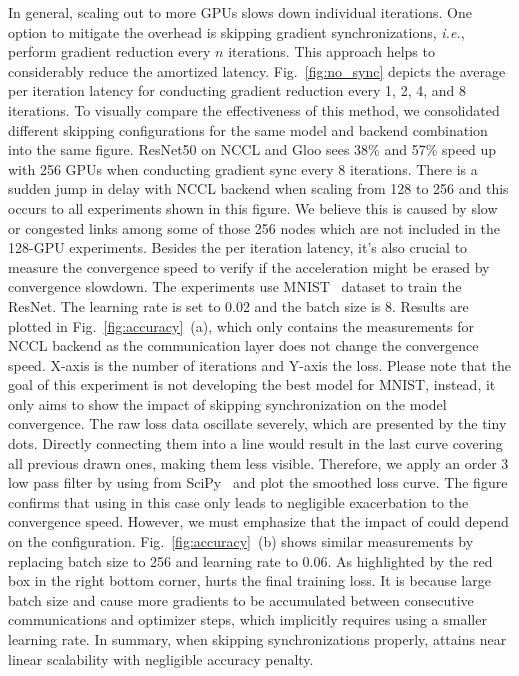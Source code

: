 In general, scaling out to more GPUs slows down individual iterations. One option to mitigate the overhead is skipping gradient synchronizations, \emph{i.e.}, perform gradient reduction every $n$ iterations. This approach helps to considerably reduce the amortized latency. Fig.~\ref{fig:no_sync} depicts the average per iteration latency for conducting gradient reduction every 1, 2, 4, and 8 iterations. To visually compare the effectiveness of this method, we consolidated different skipping configurations for the same model and backend combination into the same figure. 
ResNet50 on NCCL and Gloo sees 38\% and 57\% speed up with 256 GPUs when conducting gradient sync every 8 iterations. There is a sudden jump in delay with NCCL backend when scaling from 128 to 256 and this occurs to all experiments shown in this figure. We believe this is caused by slow or congested links among some of those 256 nodes which are not included in the 128-GPU experiments.
%
Besides the per iteration latency, it's also crucial to measure the convergence speed to verify if the acceleration might be erased by convergence slowdown. The experiments use MNIST~\cite{mnist} dataset to train the ResNet. The learning rate is set to 0.02 and the batch size is 8. Results are plotted in Fig.~\ref{fig:accuracy}~(a), which only contains the measurements for NCCL backend as the communication layer does not change the convergence speed. X-axis is the number of iterations and Y-axis the loss. Please note that the goal of this experiment is not developing the best model for MNIST, instead, it only aims to show the impact of skipping synchronization on the model convergence. The raw loss data oscillate severely, which are presented by the tiny dots. Directly connecting them into a line would result in the last curve covering all previous drawn ones, making them less visible. Therefore, we apply an order 3 low pass filter by using  from SciPy~\cite{scipy} and plot the smoothed loss curve. The figure confirms that using  in this case only leads to negligible exacerbation to the convergence speed. However, we must emphasize that the impact of  could depend on the configuration. Fig.~\ref{fig:accuracy}~(b) shows similar measurements by replacing batch size to 256 and learning rate to 0.06. As highlighted by the red box in the right bottom corner,  hurts the final training loss. It is because large batch size and  cause more gradients to be accumulated between consecutive communications and optimizer steps, which implicitly requires using a smaller learning rate. In summary, when skipping synchronizations properly,  attains near linear scalability with negligible accuracy penalty. 

